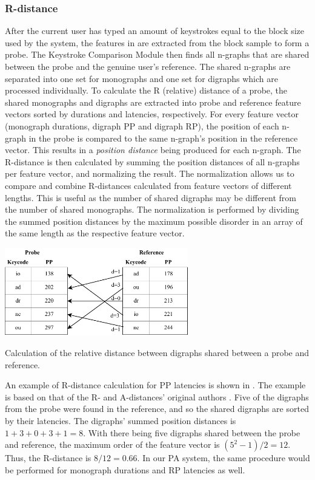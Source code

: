 \subsubsection{R-distance}

After the current user has typed an amount of keystrokes equal to the block size used by the system, the features in  are extracted from the block sample to form a probe.
The Keystroke Comparison Module then finds all n-graphs that are shared between the probe and the genuine user's reference.
The shared n-graphs are separated into one set for monographs and one set for digraphs which are processed individually.
To calculate the R (relative) distance of a probe, the shared monographs and digraphs are extracted into probe and reference feature vectors sorted by durations and latencies, respectively.
For every feature vector (monograph durations, digraph PP and digraph RP), the position of each n-graph in the probe is compared to the same n-graph's position in the reference vector.
This results in a \textit{position distance} being produced for each n-graph.
The R-distance is then calculated by summing the position distances of all n-graphs per feature vector, and normalizing the result.
The normalization allows us to compare and combine R-distances calculated from feature vectors of different lengths. 
This is useful as the number of shared digraphs may be different from the number of shared monographs.
The normalization is performed by dividing the summed position distances by the maximum possible disorder in an array of the same length as the respective feature vector.

\begin{table}[h]
\centering
    \includegraphics[width=0.6\textwidth]{figures/R-measure_OC.pdf}
    \caption{Calculation of the relative distance between digraphs shared between a probe and reference.}
    \label{tab:R-distance}
\end{table}

An example of R-distance calculation for PP latencies is shown in . The example is based on that of the R- and A-distances' original authors \cite{gnp}.
Five of the digraphs from the probe were found in the reference, and so the shared digraphs are sorted by their latencies.
The digraphs' summed position distances is $1 + 3 + 0 + 3 + 1 = 8$.
With there being five digraphs shared between the probe and reference, the maximum order of the feature vector is $(5^2 - 1)/2 = 12$.
Thus, the R-distance is $8/12 = 0.66$.
In our PA system, the same procedure would be performed for monograph durations and RP latencies as well.

